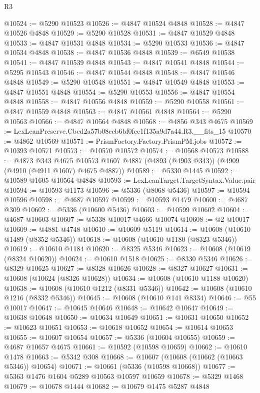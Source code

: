 \begin{lexlean}{R3}
\begin{coremodule}
@10524 := @5290 @10523
@10526 := @4847 @10524 @4848
@10528 := @4847 @10526 @4848
@10529 := @5290 @10528
@10531 := @4847 @10529 @4848
@10533 := @4847 @10531 @4848
@10534 := @5290 @10533
@10536 := @4847 @10534 @4848
@10538 := @4847 @10536 @4848
@10539 := @6549 @10538
@10541 := @4847 @10539 @4848
@10543 := @4847 @10541 @4848
@10544 := @5295 @10543
@10546 := @4847 @10544 @4848
@10548 := @4847 @10546 @4848
@10549 := @5290 @10548
@10551 := @4847 @10549 @4848
@10553 := @4847 @10551 @4848
@10554 := @5290 @10553
@10556 := @4847 @10554 @4848
@10558 := @4847 @10556 @4848
@10559 := @5290 @10558
@10561 := @4847 @10559 @4848
@10563 := @4847 @10561 @4848
@10564 := @5290 @10563
@10566 := @4847 @10564 @4848
@10568 := @4856 @343 @4675
@10569 := LexLeanPreserve.Cbed2a57b08ceb6bf0fec1f135a9d7a44.R3.__fits_15
@10570 := @4862 @10569
@10571 := PrismFactory.Factory.PrismPM.jobs
@10572 := @10393 @10571
@10573 := @10570 @10572
@10574 := @10568 @10573
@10588 := @4873
    @343
    @4675
    @10573
    @1607
    @4887
    (@4893 (@4903 @343))
    (@4909 (@4910 (@4911 @1607) @4675 @4887))
@10589 := @5330 @1445
@10592 := @10589 @1605 @10564 @4848
@10593 := LexLeanTarget.TargetSyntax.Value.pair
@10594 := @10593 @1173
@10596 := @5336 (@8068 @5436)
@10597 := @10594 @10596
@10598 := @4687 @10597
@10599 := @10593 @1479
@10600 := @4687 @309
@10602 := @5336 (@10600 @5436)
@10603 := @10599 @10602
@10604 := @4687 @10603
@10607 := @5338 @10017 @4666 @10074
@10608 := @2 @10017
@10609 := @4881 @4748
@10610 := @10609 @5119
@10614 := @10608 (@10610 @1489 (@8352 @5346))
@10618 := @10608 (@10610 @1180 (@8323 @5346))
@10619 := @10610 @1184
@10620 := @8325 @5346
@10623 := @10608 (@10619 (@8324 @10620))
@10624 := @10610 @1518
@10625 := @8330 @5346
@10626 := @8329 @10625
@10627 := @8328 @10626
@10628 := @8327 @10627
@10631 := @10608 (@10624 (@8326 @10628))
@10634 := @10608 (@10610 @1188 @10620)
@10638 := @10608 (@10610 @1212 (@8331 @5346))
@10642 := @10608 (@10610 @1216 (@8332 @5346))
@10645 := @10608 (@10610 @141 @8334)
@10646 := @55 @10017
@10647 := @10645 @10646
@10648 := @10642 @10647
@10649 := @10638 @10648
@10650 := @10634 @10649
@10651 := @10631 @10650
@10652 := @10623 @10651
@10653 := @10618 @10652
@10654 := @10614 @10653
@10655 := @10607 @10654
@10657 := @5336 (@10604 @10655)
@10659 := @4687 @10657 @4675
@10661 := @10592 (@10598 @10659)
@10662 := @10610 @1478
@10663 := @5342 @308
@10668 := @10607 (@10608 (@10662 (@10663 @5346)) @10654)
@10671 := @10661 (@5336 (@10598 @10668))
@10677 := @5363 @1476 @1604 @5289 @10563 @10597 @10659
@10678 := @5329 @1468
@10679 := @10678 @1444
@10682 := @10679 @1475 @5287 @4848

\end{coremodule}
\end{lexlean}
